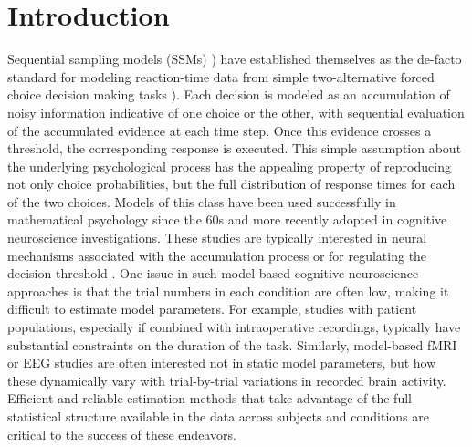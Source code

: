 \documentclass[letterpaper,10pt,english]{article}
\begin{document}
\section*{Introduction}
\label{intro:introduction}\label{intro:index-0}\label{intro:chap-introduction}\label{intro::doc}
Sequential sampling models (SSMs) \citep{TownsendAshby83}) have established themselves as the de-facto standard for modeling reaction-time data from simple two-alternative forced choice decision making tasks \citep{SmithRatcliff04}). Each decision is modeled as an accumulation of noisy information indicative of one choice or the other, with sequential evaluation of the accumulated evidence at each time step. Once this evidence crosses a threshold, the corresponding response is executed. This simple assumption about the underlying psychological process has the appealing property of reproducing not only choice probabilities, but the full distribution of response times for each of the two choices. Models of this class have been used successfully in mathematical psychology since the 60s and more recently adopted in cognitive neuroscience investigations. These studies are typically interested in neural mechanisms associated with the accumulation process or for regulating the decision threshold \citep[e.g.][]{ForstmannDutilhBrownEtAl08,CavanaghWieckiCohenEtAl11,RatcliffPhiliastidesSajda09}. One issue in such model-based cognitive neuroscience approaches is that the trial numbers in each condition are often low, making it difficult to estimate model parameters. For example, studies with patient populations, especially if combined with intraoperative recordings, typically have substantial constraints on the duration of the task. Similarly, model-based fMRI or EEG studies are often interested not in static model parameters, but how these dynamically vary with trial-by-trial variations in recorded brain activity. Efficient and reliable estimation methods that take advantage of the full statistical structure available in the data across subjects and conditions are critical to the success of these endeavors.
\end{document}
